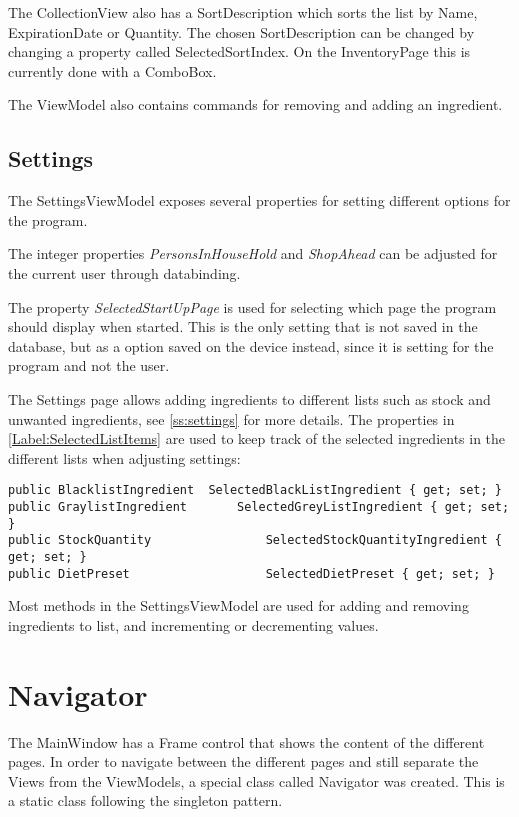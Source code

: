 The CollectionView also has a SortDescription which sorts the list by Name, ExpirationDate or Quantity. The chosen SortDescription can be changed by changing a property called SelectedSortIndex. On the InventoryPage this is currently done with a ComboBox.

The ViewModel also contains commands for removing and adding an ingredient.

\section{Settings}
The SettingsViewModel exposes several properties for setting different options for the program.

The integer properties \textit{PersonsInHouseHold} and \textit{ShopAhead} can be adjusted for the current user through databinding.

The property \textit{SelectedStartUpPage} is used for selecting which page the program should display when started. This is the only setting that is not saved in the database, but as a option saved on the device instead, since it is setting for the program and not the user.

The Settings page allows adding ingredients to different lists such as stock and unwanted ingredients, see \cref{ss:settings} for more details.
The properties in \cref{Label:SelectedListItems} are used to keep track of the selected ingredients in the different lists when adjusting settings:
\begin{lstlisting}[caption=Selected list items, language=CSharp, label={Label:SelectedListItems}]
public BlacklistIngredient	SelectedBlackListIngredient { get; set; }
public GraylistIngredient		SelectedGreyListIngredient { get; set; }
public StockQuantity 				SelectedStockQuantityIngredient { get; set; }
public DietPreset 					SelectedDietPreset { get; set; }
\end{lstlisting}

Most methods in the SettingsViewModel are used for adding and removing ingredients to list, and incrementing or decrementing values.

\chapter{Navigator} \label{NavigatorLabel}
The MainWindow has a Frame control that shows the content of the different pages. In order to navigate between the different pages and still separate the Views from the ViewModels, a special class called Navigator was created. This is a static class following the singleton pattern. 

